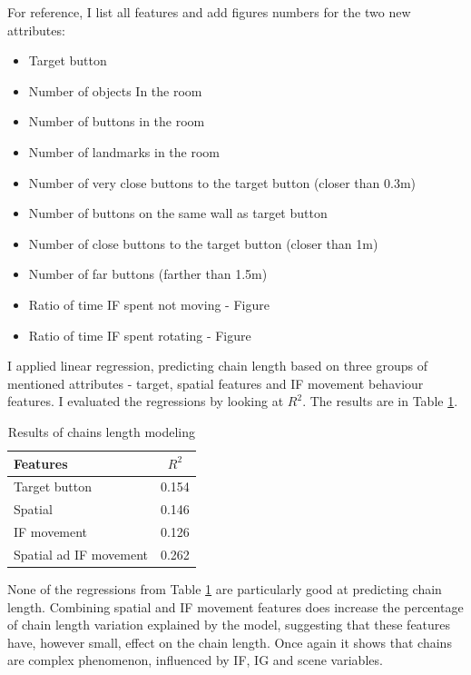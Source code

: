For reference, I list all features and add figures numbers for the two new attributes:
\begin{itemize}
\item
Target button	
\item
Number of objects In the room
\item
Number of buttons in the room
\item
Number of landmarks in the room
\item
Number of very close buttons to the target button (closer than 0.3m)
\item
Number of buttons on the same wall as target button
\item
Number of close buttons to the target button (closer than 1m)
\item
Number of far buttons (farther than 1.5m)
\item
Ratio of time IF spent not moving - Figure \label{fig:chains-distrib-stop}
\item
Ratio of time IF spent rotating - Figure \label{fig:chains-distrib-rotate}
\end{itemize}

I applied linear regression, predicting chain length based on three groups of mentioned attributes - target, spatial features and IF movement behaviour features. I evaluated the regressions by looking at $R^2$. The results are in Table \ref{tab:chains-lr-length}.

\begin{table}[!htbp]
 \centering
\begin{tabular}{lc}
\toprule
Features & $R^2$  \\
\midrule
Target button & 0.154\\
Spatial & 0.146 \\
IF movement & 0.126 \\
Spatial ad IF movement & 0.262 \\
\bottomrule
\end{tabular}
\caption{Results of chains length modeling}
\label{tab:chains-lr-length}
\end{table}

None of the regressions from Table \ref{tab:chains-lr-length} are particularly good at predicting chain length. Combining spatial and IF movement features does increase the percentage of chain length variation explained by the model, suggesting that these features have, however small, effect on the chain length. Once again it shows that chains are complex phenomenon, influenced by IF, IG and scene variables.

